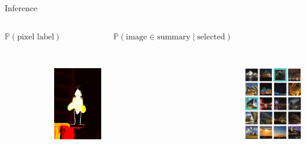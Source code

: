 \documentclass[mathserif]{beamer}
\begin{document}
\begin{frame}{Inference}
\vspace{1em}
\begin{columns}[c]
\centering
$\mathbb{P}(\textrm{pixel label})$

\vspace{0.7em}
\centering
\includegraphics[height=2.6in]{figures/bee_marginals.png}

\centering
$\mathbb{P}(\textrm{image} \in \textrm{summary} \mid \textrm{selected})$

\vspace{0.7em}
\centering
\includegraphics[height=2.6in]{figures/flickr_inference.pdf}
\end{columns}
\end{frame}
\end{document}
